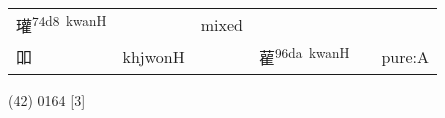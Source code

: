 \documentclass[14pt,a4paper]{scrartcl}
\begin{document}
\begin{longtable}[c]{@{}llllll@{}}
\begin{minipage}[t]{0.14\columnwidth}
瓘\textsuperscript{74d8~kwanH}
\strut\end{minipage} &
\begin{minipage}[t]{0.14\columnwidth}\raggedright\strut
\strut\end{minipage} &
\begin{minipage}[t]{0.14\columnwidth}\raggedright\strut
mixed
\strut\end{minipage}\tabularnewline
\begin{minipage}[t]{0.14\columnwidth}\raggedright\strut
吅
\strut\end{minipage} &
\begin{minipage}[t]{0.14\columnwidth}\raggedright\strut
khjwonH
\strut\end{minipage} &
\begin{minipage}[t]{0.14\columnwidth}\raggedright\strut
\strut\end{minipage} &
\begin{minipage}[t]{0.14\columnwidth}\raggedright\strut
雚\textsuperscript{96da~kwanH}
\strut\end{minipage} &
\begin{minipage}[t]{0.14\columnwidth}\raggedright\strut
\strut\end{minipage} &
\begin{minipage}[t]{0.14\columnwidth}\raggedright\strut
pure:A
\strut\end{minipage}\tabularnewline
\bottomrule
\end{longtable}

(42) 0164 {[}3{]}
\end{document}
